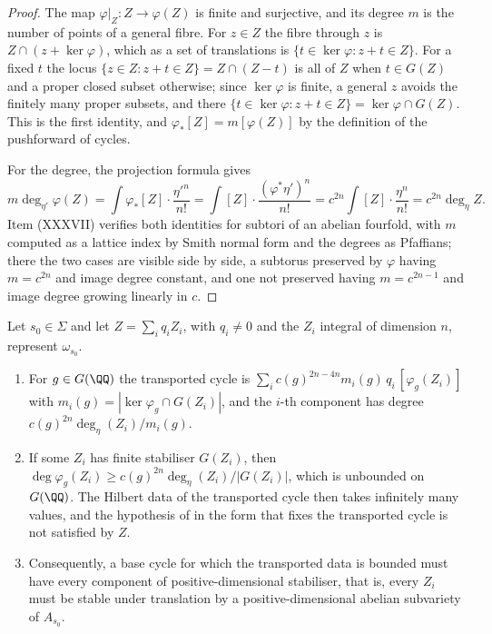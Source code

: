 \begin{proof}
The map $\varphi|_{Z}\colon Z\to\varphi(Z)$ is finite and surjective, and its
degree $m$ is the number of points of a general fibre. For $z\in Z$ the fibre
through $z$ is $Z\cap(z+\ker\varphi)$, which as a set of translations is
$\{t\in\ker\varphi:z+t\in Z\}$. For a fixed $t$ the locus
$\{z\in Z:z+t\in Z\}=Z\cap(Z-t)$ is all of $Z$ when $t\in G(Z)$ and a proper
closed subset otherwise; since $\ker\varphi$ is finite, a general $z$ avoids
the finitely many proper subsets, and there
$\{t\in\ker\varphi:z+t\in Z\}=\ker\varphi\cap G(Z)$. This is the first
identity, and $\varphi_{*}[Z]=m[\varphi(Z)]$ by the definition of the
pushforward of cycles.

For the degree, the projection formula gives
\[
  m\deg_{\eta'}\varphi(Z)=\int\varphi_{*}[Z]\cdot\frac{\eta'^{n}}{n!}
  =\int[Z]\cdot\frac{(\varphi^{*}\eta')^{n}}{n!}
  =c^{2n}\int[Z]\cdot\frac{\eta^{n}}{n!}=c^{2n}\deg_{\eta}Z .
\]
Item (XXXVII) verifies both identities for subtori of an abelian fourfold,
with $m$ computed as a lattice index by Smith normal form and the degrees as
Pfaffians; there the two cases are visible side by side, a subtorus preserved
by $\varphi$ having $m=c^{2n}$ and image degree constant, and one not
preserved having $m=c^{2n-1}$ and image degree growing linearly in $c$.
\end{proof}

\begin{theorem}\label{thm:p1forces}
Let $s_{0}\in\Sigma$ and let $Z=\sum_{i}q_{i}Z_{i}$, with $q_{i}\ne0$ and the
$Z_{i}$ integral of dimension $n$, represent $\omega_{s_{0}}$.
\begin{enumerate}[label=\textup{(\roman*)},leftmargin=2.6em,itemsep=2pt]
\item For $g\in G(\QQ)$ the transported cycle is
  $\sum_{i}c(g)^{2n-4n}m_{i}(g)\,q_{i}\,[\varphi_{g}(Z_{i})]$ with
  $m_{i}(g)=|\ker\varphi_{g}\cap G(Z_{i})|$, and the $i$-th component has
  degree $c(g)^{2n}\deg_{\eta}(Z_{i})/m_{i}(g)$.
\item If some $Z_{i}$ has finite stabiliser $G(Z_{i})$, then
  $\deg\varphi_{g}(Z_{i})\ge c(g)^{2n}\deg_{\eta}(Z_{i})/|G(Z_{i})|$, which is
  unbounded on $G(\QQ)$. The Hilbert data of the transported cycle then takes
  infinitely many values, and the hypothesis of  in the
  form that fixes the transported cycle is not satisfied by $Z$.
\item Consequently, a base cycle for which the transported data is bounded
  must have every component of positive-dimensional stabiliser, that is, every
  $Z_{i}$ must be stable under translation by a positive-dimensional abelian
  subvariety of $A_{s_{0}}$.
\end{enumerate}
\end{theorem}

